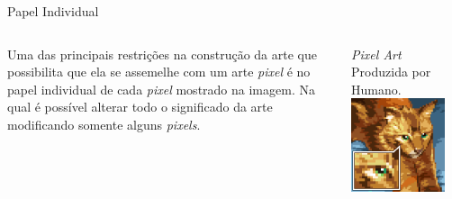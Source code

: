\documentclass[compress,12pt]{beamer}
\begin{document}
\begin{frame}{Papel Individual}
	\begin{columns}
		\begin{column}{0.5\textwidth}
                Uma das principais restrições na construção da arte que possibilita que ela se assemelhe com um arte \textit{pixel} é no papel individual de cada \textit{pixel} mostrado na imagem.
                \vfill
                Na qual é possível alterar todo o significado da arte modificando somente alguns \textit{pixels}.
			        
		\end{column}
		\begin{column}{0.5\textwidth}  %
			\begin{center}
                {\textit{Pixel Art} Produzida por Humano.} 
				\includegraphics[width=0.85\textwidth]{Images/catImage.png}
			\end{center}
		\end{column}
	\end{columns}
\end{frame}
\end{document}
